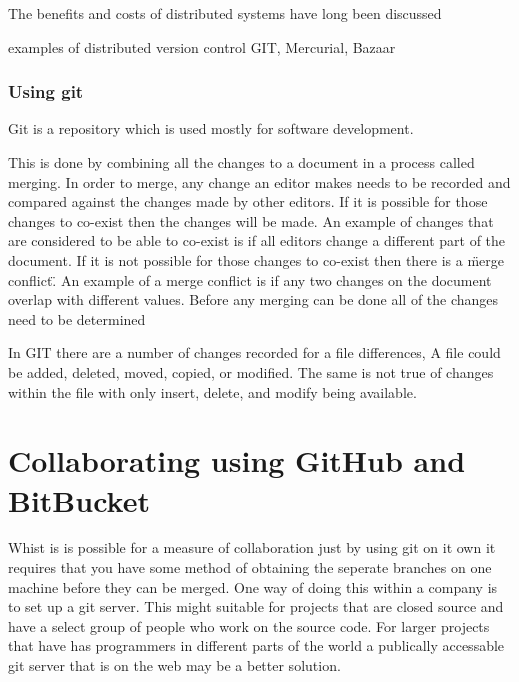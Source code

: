 
The benefits and costs of distributed systems have long been discussed

examples of distributed version control
GIT, Mercurial, Bazaar


\subsubsection{Using git}
Git is a repository which is used mostly for software development.

This is done by combining all the changes to a document in a process called merging. 
In order to merge, any change an editor makes needs to be recorded and compared against the changes made by other editors.
If it is possible for those changes to co-exist then the changes will be made.
An example of changes that are considered to be able to co-exist is if all editors change a different part of the document.
If it is not possible for those changes to co-exist then there is a \"merge conflict\".
An example of a merge conflict is if any two changes on the document overlap with different values.
Before any merging can be done all of the changes need to be determined

In GIT there are a number of changes recorded for a file differences,  A file could be added, deleted, moved, copied, or modified.  The same is not true of changes within the file with only insert, delete, and modify being available.


\section{Collaborating using GitHub and BitBucket}
Whist is is possible for a measure of collaboration just by using git on it own it requires that you have some method of obtaining the seperate branches on one machine before they can be merged.  One way of doing this within a company is to set up a git server.  This might suitable for projects that are closed source and have a select group of people who work on the source code.  For larger projects that have has programmers in different parts of the world a publically accessable git server that is on the web may be a better solution.  

